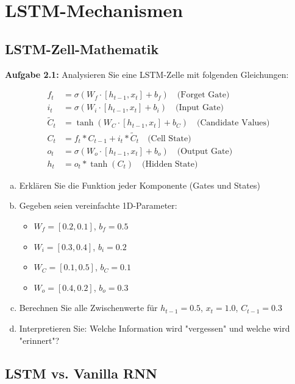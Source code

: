 \documentclass[12pt,a4paper]{article}
\begin{document}
\section{LSTM-Mechanismen}

\subsection{LSTM-Zell-Mathematik}

\textbf{Aufgabe 2.1:} Analysieren Sie eine LSTM-Zelle mit folgenden Gleichungen:

\begin{align}
f_t &= \sigma(W_f \cdot [h_{t-1}, x_t] + b_f) \quad \text{(Forget Gate)} \\
i_t &= \sigma(W_i \cdot [h_{t-1}, x_t] + b_i) \quad \text{(Input Gate)} \\
\tilde{C}_t &= \tanh(W_C \cdot [h_{t-1}, x_t] + b_C) \quad \text{(Candidate Values)} \\
C_t &= f_t * C_{t-1} + i_t * \tilde{C}_t \quad \text{(Cell State)} \\
o_t &= \sigma(W_o \cdot [h_{t-1}, x_t] + b_o) \quad \text{(Output Gate)} \\
h_t &= o_t * \tanh(C_t) \quad \text{(Hidden State)}
\end{align}

\begin{enumerate}[(a)]
    \item Erklären Sie die Funktion jeder Komponente (Gates und States)
    \item Gegeben seien vereinfachte 1D-Parameter:
    \begin{itemize}
        \item $W_f = [0.2, 0.1]$, $b_f = 0.5$
        \item $W_i = [0.3, 0.4]$, $b_i = 0.2$  
        \item $W_C = [0.1, 0.5]$, $b_C = 0.1$
        \item $W_o = [0.4, 0.2]$, $b_o = 0.3$
    \end{itemize}
    \item Berechnen Sie alle Zwischenwerte für $h_{t-1} = 0.5$, $x_t = 1.0$, $C_{t-1} = 0.3$
    \item Interpretieren Sie: Welche Information wird "vergessen" und welche wird "erinnert"?
\end{enumerate}

\subsection{LSTM vs. Vanilla RNN}
\end{document}
